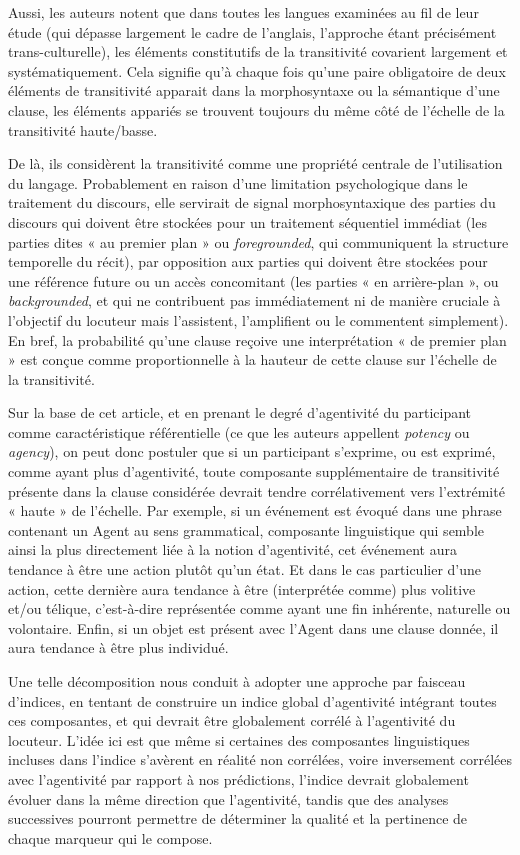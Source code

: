 Aussi, les auteurs notent que dans toutes les langues examinées au fil de leur étude (qui dépasse largement le cadre de l’anglais, l’approche étant précisément trans-culturelle), les éléments constitutifs de la transitivité covarient largement et systématiquement. Cela signifie qu'à chaque fois qu'une paire obligatoire de deux éléments de transitivité apparait dans la morphosyntaxe ou la sémantique d'une clause, les éléments appariés se trouvent toujours du même côté de l'échelle de la transitivité haute/basse. 

De là, ils considèrent la transitivité comme une propriété centrale de l'utilisation du langage. Probablement en raison d'une limitation psychologique dans le traitement du discours, elle servirait de signal morphosyntaxique des parties du discours qui doivent être stockées pour un traitement séquentiel immédiat (les parties dites « au premier plan » ou \textit{foregrounded}, qui communiquent la structure temporelle du récit), par opposition aux parties qui doivent être stockées pour une référence future ou un accès concomitant (les parties « en arrière-plan », ou \textit{backgrounded}, et qui ne contribuent pas immédiatement ni de manière cruciale à l'objectif du locuteur mais l'assistent, l'amplifient ou le commentent simplement). En bref, la probabilité qu'une clause reçoive une interprétation « de premier plan » est conçue comme proportionnelle à la hauteur de cette clause sur l'échelle de la transitivité. 

Sur la base de cet article, et en prenant le degré d’agentivité du participant comme caractéristique référentielle (ce que les auteurs appellent \textit{potency} ou \textit{agency}), on peut donc postuler que si un participant s’exprime, ou est exprimé, comme ayant plus d’agentivité, toute composante supplémentaire de transitivité présente dans la clause considérée devrait tendre corrélativement vers l'extrémité « haute » de l'échelle. Par exemple, si un événement est évoqué dans une phrase contenant un Agent au sens grammatical, composante linguistique qui semble ainsi la plus directement liée à la notion d’agentivité, cet événement aura tendance à être une action plutôt qu'un état. Et dans le cas particulier d’une action, cette dernière aura tendance à être (interprétée comme) plus volitive et/ou télique, c'est-à-dire représentée comme ayant une fin inhérente, naturelle ou volontaire. Enfin, si un objet est présent avec l'Agent dans une clause donnée, il aura tendance à être plus individué.

Une telle décomposition nous conduit à adopter une approche par faisceau d’indices, en tentant de construire un indice global d'agentivité intégrant toutes ces composantes, et qui devrait être globalement corrélé à l'agentivité du locuteur. L’idée ici est que même si certaines des composantes linguistiques incluses dans l’indice s'avèrent en réalité non corrélées, voire inversement corrélées avec l’agentivité par rapport à nos prédictions, l'indice devrait globalement évoluer dans la même direction que l’agentivité, tandis que des analyses successives pourront permettre de déterminer la qualité et la pertinence de chaque marqueur qui le compose.

